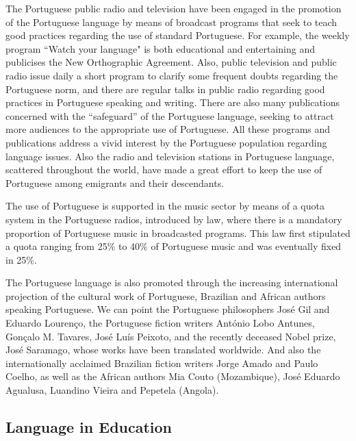 \begin{multicols}{2}

The Portuguese public radio and television have been engaged in the promotion of the Portuguese language by means of broadcast programs that seek to teach good practices regarding the use of standard Portuguese. For example, the weekly program “Watch your language" is both educational and entertaining and publicises the New Orthographic Agreement. Also, public television and public radio issue daily a short program to clarify some frequent doubts regarding the Portuguese norm, and there are regular talks in public radio regarding good practices in Portuguese speaking and writing. There are also many publications concerned with the “safeguard” of the Portuguese language, seeking to attract more audiences to the appropriate use of Portuguese. All these programs and publications address a vivid interest by the Portuguese population regarding language issues. Also the radio and television stations in Portuguese language, scattered throughout the world, have made a great effort to keep the use of Portuguese among emigrants and their descendants.

The use of Portuguese is supported in the music sector by means of a quota system in the Portuguese radios, introduced by law, where there is a mandatory proportion of Portuguese music in broadcasted programs. This law first stipulated a quota ranging from 25\% to 40\% of Portuguese music and was eventually fixed in 25\%. 


The Portuguese language is also promoted through the increasing international projection of the cultural work of Portuguese, Brazilian and African authors speaking Portuguese. We can point the Portuguese philosophers José Gil and Eduardo Lourenço, the Portuguese fiction writers António Lobo Antunes, Gonçalo M. Tavares, José Luís Peixoto, and the recently deceased Nobel prize, José Saramago, whose works have been translated worldwide. And also the internationally acclaimed Brazilian fiction writers Jorge Amado and Paulo Coelho, as well as the African authors Mia Couto (Mozambique), José Eduardo Agualusa, Luandino Vieira and Pepetela (Angola).

\subsection{Language in Education}


\end{multicols}
